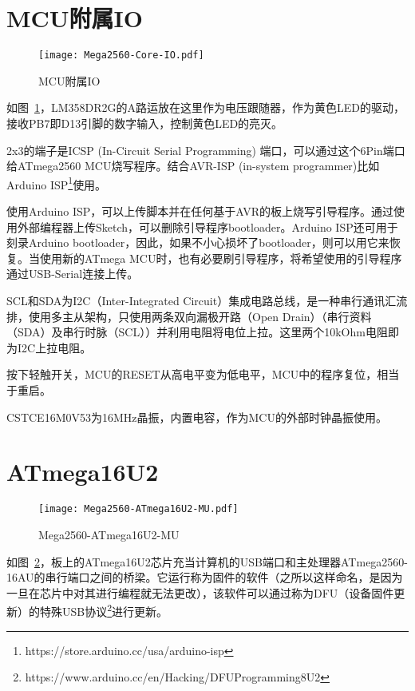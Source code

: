 \section{MCU附属IO}

\begin{figure}[htbp]
    \centering
    \texttt{[image: Mega2560-Core-IO.pdf]}
    \caption{MCU附属IO}
    \label{fig:Mega2560-Core-IO}
\end{figure}

如图~\ref{fig:Mega2560-Core-IO}，LM358DR2G的A路运放在这里作为电压跟随器，作为黄色LED的驱动，接收PB7即D13引脚的数字输入，控制黄色LED的亮灭。

2x3的端子是ICSP (In-Circuit Serial Programming) 端口，可以通过这个6Pin端口给ATmega2560 MCU烧写程序。结合AVR-ISP (in-system programmer)比如Arduino ISP\footnote{https://store.arduino.cc/usa/arduino-isp}使用。

使用Arduino ISP，可以上传脚本并在任何基于AVR的板上烧写引导程序。通过使用外部编程器上传Sketch，可以删除引导程序bootloader。Arduino ISP还可用于刻录Arduino bootloader，因此，如果不小心损坏了bootloader，则可以用它来恢复。当使用新的ATmega MCU时，也有必要刷引导程序，将希望使用的引导程序通过USB-Serial连接上传。

SCL和SDA为I2C（Inter-Integrated Circuit）集成电路总线，是一种串行通讯汇流排，使用多主从架构，只使用两条双向漏极开路（Open Drain）（串行资料（SDA）及串行时脉（SCL））并利用电阻将电位上拉。这里两个10kOhm电阻即为I2C上拉电阻。

按下轻触开关，MCU的RESET从高电平变为低电平，MCU中的程序复位，相当于重启。

CSTCE16M0V53为16MHz晶振，内置电容，作为MCU的外部时钟晶振使用。

\section{ATmega16U2}

\begin{figure}[htbp]
    \centering
    \texttt{[image: Mega2560-ATmega16U2-MU.pdf]}
    \caption{Mega2560-ATmega16U2-MU}
    \label{fig:Mega2560-ATmega16U2-MU}
\end{figure}

如图~\ref{fig:Mega2560-ATmega16U2-MU}，板上的ATmega16U2芯片充当计算机的USB端口和主处理器ATmega2560-16AU的串行端口之间的桥梁。它运行称为固件的软件（之所以这样命名，是因为一旦在芯片中对其进行编程就无法更改），该软件可以通过称为DFU（设备固件更新）的特殊USB协议\footnote{https://www.arduino.cc/en/Hacking/DFUProgramming8U2}进行更新。

